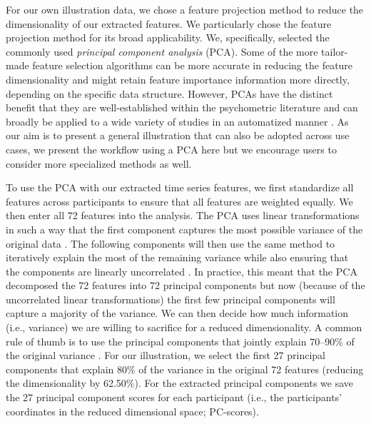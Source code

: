 \documentclass[man, 12pt, a4paper, floatsintext]{apa7}
\theoremstyle{break}
\theoremstyle{plain}
\begin{document}


For our own illustration data, we chose a feature projection method to
reduce the dimensionality of our extracted features. We particularly
chose the feature projection method for its broad applicability. We,
specifically, selected the commonly used
\textit{principal component analysis} (PCA). Some of the more
tailor-made feature selection algorithms can be more accurate in
reducing the feature dimensionality and might retain feature importance
information more directly, depending on the specific data structure.
However, PCAs have the distinct benefit that they are well-established
within the psychometric literature \citep{jolliffe2011} and can broadly
be applied to a wide variety of studies in an automatized manner
\citep{abdi2010}. As our aim is to present a general illustration that
can also be adopted across use cases, we present the workflow using a
PCA here but we encourage users to consider more specialized methods as
well.

To use the PCA with our extracted time series features, we first
standardize all features across participants to ensure that all features
are weighted equally. We then enter all 72 features into the analysis.
The PCA uses linear transformations in such a way that the first
component captures the most possible variance of the original data
\citep[e.g., by finding a vector that maximizes the sum of squared distances][]{jolliffe2002, abdi2010}.
The following components will then use the same method to iteratively
explain the most of the remaining variance while also ensuring that the
components are linearly uncorrelated \citep{shlens2014}. In practice,
this meant that the PCA decomposed the 72 features into 72 principal
components but now (because of the uncorrelated linear transformations)
the first few principal components will capture a majority of the
variance. We can then decide how much information (i.e., variance) we
are willing to sacrifice for a reduced dimensionality. A common rule of
thumb is to use the principal components that jointly explain 70--90\%
of the original variance
\citep[i.e., cumulative percentage explained variance; e.g.,][]{jackson2003}.
For our illustration, we select the first 27 principal components that
explain 80\% of the variance in the original 72 features (reducing the
dimensionality by 62.50\%). For the extracted principal components we
save the 27 principal component scores for each participant (i.e., the
participants' coordinates in the reduced dimensional space; PC-scores).
\end{document}
